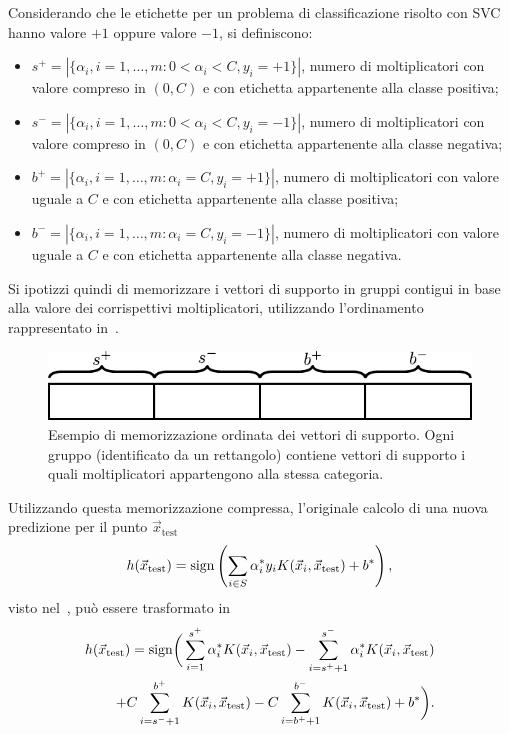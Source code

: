 Considerando che le etichette per un problema di classificazione risolto con SVC hanno valore $+1$ oppure valore $-1$, si definiscono:
\begin{itemize}
    \item $s^+ = |\{\alpha_i, i=1,\dots,m : 0 < \alpha_i < C, y_i=+1\}|$, numero di moltiplicatori con valore compreso in $(0, C)$ e con etichetta appartenente alla classe positiva;
    \item $s^- = |\{\alpha_i, i=1,\dots,m : 0 < \alpha_i < C, y_i=-1\}|$, numero di moltiplicatori con valore compreso in $(0, C)$ e con etichetta appartenente alla classe negativa;
    \item $b^+ = |\{\alpha_i, i=1,\dots,m : \alpha_i = C, y_i=+1\}|$, numero di moltiplicatori con valore uguale a $C$ e con etichetta appartenente alla classe positiva;
    \item $b^- = |\{\alpha_i, i=1,\dots,m : \alpha_i = C, y_i=-1\}|$, numero di moltiplicatori con valore uguale a $C$ e con etichetta appartenente alla classe negativa.
\end{itemize}
Si ipotizzi quindi di memorizzare i vettori di supporto in gruppi contigui in base alla valore dei corrispettivi moltiplicatori, utilizzando l'ordinamento rappresentato in~.
\begin{figure}
    \centering
    \includegraphics{img/memorizzazione_sv.pdf}
    \caption{Esempio di memorizzazione ordinata dei vettori di supporto. Ogni gruppo (identificato da un rettangolo) contiene vettori di supporto i quali moltiplicatori appartengono alla stessa categoria.}
    \label{fig:schema_memorizzazione_sv}
\end{figure}
Utilizzando questa memorizzazione compressa, l'originale calcolo di una nuova predizione per il punto $\Vec{x}_{\text{test}}$
\begin{equation*}
    h(\Vec{x}_{\text{test}}) = \mathrm{sign}\left(\sum_{i \in S}\alpha_i^*y_iK(\Vec{x}_i, \Vec{x}_\text{test}) + b^*\right),
\end{equation*}
visto nel~, può essere trasformato in
\begin{align*}
    h(\Vec{x}_{\text{test}}) = \mathrm{sign}\bigg(
            \sum_{i=1}^{s^+}\alpha_i^*K(\Vec{x}_i, \Vec{x}_\text{test}) 
            -\sum_{i=s^++1}^{s^-}\alpha_i^*K(\Vec{x}_i, \Vec{x}_\text{test})\\
            +C\sum_{i=s^-+1}^{b^+}K(\Vec{x}_i, \Vec{x}_\text{test})
            -C\sum_{i=b^++1}^{b^-}K(\Vec{x}_i, \Vec{x}_\text{test}) 
            + b^*
        \bigg).
\end{align*}
